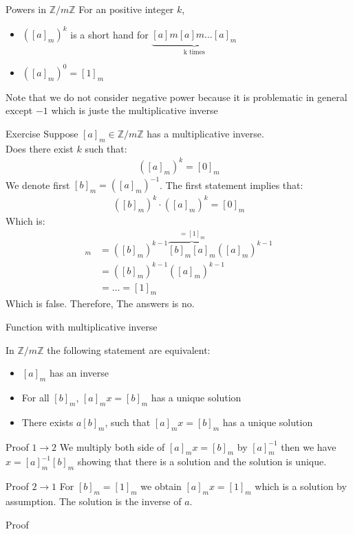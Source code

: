 \begin{parag}{Powers in $ \mathbb{Z}/ m \mathbb{Z}$}
    For an positive integer $k$,
    \begin{itemize}
        \item $([a]_m)^k$ is a short hand for $ \underbrace{[a]m[a]m \dots[a]_m}_{ \text{k times}}$
        \item $([a]_m)^0 = [1]_m$
    \end{itemize}
    Note that we do not consider negative power because it is problematic in general except $-1$ which is juste the multiplicative inverse

\end{parag}


\begin{parag}{Exercise}
    Suppose $[a]_m \in \mathbb{Z} / m \mathbb{Z}$ has a multiplicative inverse.\\
    Does there exist $k$ such that:
    \begin{align*}
        ([a]_m)^k = [0]_m
    \end{align*}
    We denote first $[b]_m = ([a]_m)^{-1}$. The first statement implies that:
    \begin{align*}
        ([b]_m)^k \cdot ([a]_m)^k = [0]_m
    \end{align*}
    Which is:
    \begin{align*}
        [0]_m &= ([b]_m)^{k-1} \overbrace{[b]_m[a]_m}^{= [1]_m} ([a]_m)^{k-1}\\
        &=([b]_m)^{k-1}([a]_m)^{k-1}\\
        &= \dots = [1]_m
    \end{align*}
    Which is false. Therefore, The answers is no.
\end{parag}
\begin{parag}{Function with multiplicative inverse}
    \begin{theoreme}
        In $ \mathbb{Z}/ m \mathbb{Z}$ the following statement are equivalent:
        \begin{itemize}
            \item $[a]_m$ has an inverse
            \item For all $[b]_m$, $[a]_m x = [b]_m$ has a unique solution
            \item There exists $a[b]_m$, such that $[a]_mx = [b]_m$ has a unique solution
        \end{itemize}
    \end{theoreme}

    \begin{subparag}{Proof $1 \to 2$}
        We multiply both side of $[a]_m x = [b]_m$ by $[a]_m^{-1}$ then we have $x = [a]_m^{-1}[b]_m$ showing that there is a solution and the solution is unique.
    \end{subparag}
    \begin{subparag}{Proof $2 \to 1$}
        For $[b]_m = [1]_m$ we obtain $[a]_mx = [1]_m$ which is a solution by assumption. The solution is the inverse of $a$.
    \end{subparag}
    \begin{subparag}{Proof}
        
    \end{subparag}
\end{parag}

